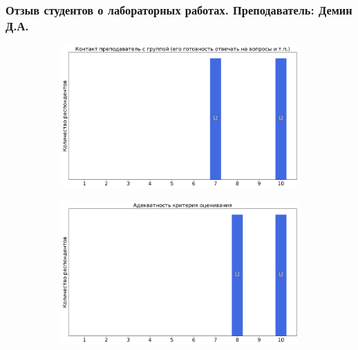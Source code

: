     \subsubsection{Отзыв студентов о лабораторных работах. Преподаватель: Демин Д.А.}
		\begin{figure}[H]
			\centering
			\begin{subfigure}[b]{0.45\textwidth}
				\centering
				\includegraphics[width=\textwidth]{images/2 course/Радиотехнические цепи и сигналы/labniks-marks-Демин Д.А.-0.png}
			\end{subfigure}
			\begin{subfigure}[b]{0.45\textwidth}
				\centering
				\includegraphics[width=\textwidth]{images/2 course/Радиотехнические цепи и сигналы/labniks-marks-Демин Д.А.-1.png}
			\end{subfigure}
			\begin{subfigure}[b]{0.45\textwidth}
				\centering

\end{subfigure}
\end{figure}
